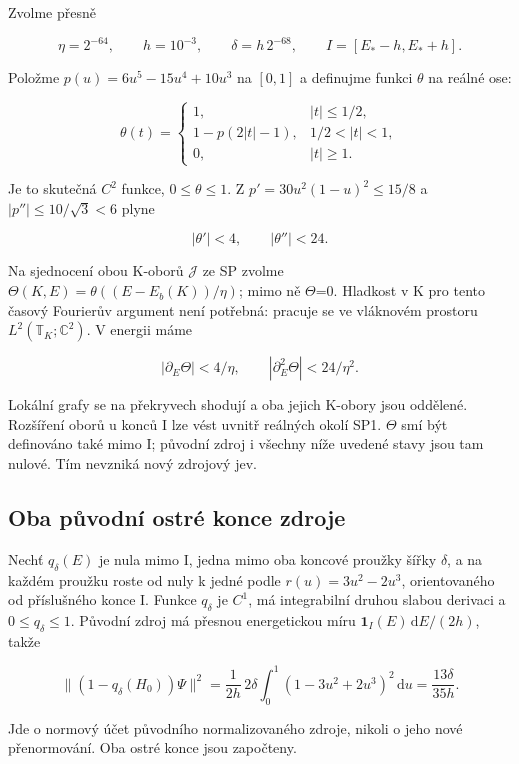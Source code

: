 \documentclass[11pt,a4paper]{article}
\theoremstyle{remark}\newtheorem{remark}[theorem]{Poznámka}
\numberwithin{equation}{section}
\begin{document}
Zvolme přesně

\[
\eta=2^{-64},\qquad h=10^{-3},\qquad
\delta=h\,2^{-68},\qquad I=[E_*-h,E_*+h].
\tag{CT1}
\]

Položme \(p(u)=6u^5-15u^4+10u^3\) na \([0,1]\) a definujme funkci
\(\theta\) na reálné ose:

\[
\theta(t)=
\begin{cases}
1,&|t|\le1/2,\\
1-p(2|t|-1),&1/2<|t|<1,\\
0,&|t|\ge1.
\end{cases}
\tag{CT2}
\]

Je to skutečná \(C^2\) funkce, \(0\le\theta\le1\). Z
\(p'=30u^2(1-u)^2\le15/8\) a \(|p''|\le10/\sqrt3<6\) plyne

\[
|\theta'|<4,\qquad |\theta''|<24.
\tag{CT3}
\]

Na sjednocení obou K-oborů \(\mathcal J\) ze SP zvolme
\(\Theta(K,E)=\theta((E-E_b(K))/\eta)\); mimo ně \(\Theta\)=0. Hladkost
v K pro tento časový Fourierův argument není potřebná: pracuje se ve
vláknovém prostoru \(L^2(\mathbb T_K;\mathbb C^2)\). V energii máme

\[
|\partial_E\Theta|<4/\eta,\qquad
|\partial_E^2\Theta|<24/\eta^2.
\tag{CT4}
\]

Lokální grafy se na překryvech shodují a oba jejich K-obory jsou
oddělené. Rozšíření oborů u konců I lze vést uvnitř reálných okolí SP1.
\(\Theta\) smí být definováno také mimo I; původní zdroj i všechny níže
uvedené stavy jsou tam nulové. Tím nevzniká nový zdrojový jev.

\hypertarget{oba-pux16fvodnuxed-ostruxe9-konce-zdroje}{%
\subsection{Oba původní ostré konce
zdroje}\label{oba-pux16fvodnuxed-ostruxe9-konce-zdroje}}

Nechť \(q_\delta(E)\) je nula mimo I, jedna mimo oba koncové proužky
šířky \(\delta\), a na každém proužku roste od nuly k jedné podle
\(r(u)=3u^2-2u^3\), orientovaného od příslušného konce I. Funkce
\(q_\delta\) je \(C^1\), má integrabilní druhou slabou derivaci a
\(0\le q_\delta\le1\). Původní zdroj má přesnou energetickou míru
\(\mathbf1_I(E)\,\mathrm dE/(2h)\), takže

\[
\|(1-q_\delta(H_0))\Psi\|^2
=\frac1{2h}\,2\delta\int_0^1(1-3u^2+2u^3)^2\,\mathrm du
=\frac{13\delta}{35h}.
\tag{CT5}
\]

Jde o normový účet původního normalizovaného zdroje, nikoli o jeho nové
přenormování. Oba ostré konce jsou započteny.
\end{document}
